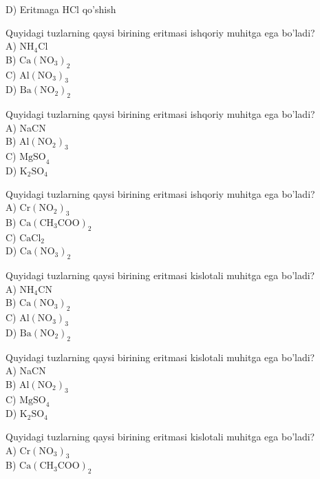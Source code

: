 D) Eritmaga HCl qo'shish
  \item Quyidagi tuzlarning qaysi birining eritmasi ishqoriy muhitga ega bo'ladi?\\
A) $\mathrm{NH}_{4} \mathrm{Cl}$\\
B) $\mathrm{Ca}\left(\mathrm{NO}_{3}\right)_{2}$\\
C) $\mathrm{Al}\left(\mathrm{NO}_{3}\right)_{3}$\\
D) $\mathrm{Ba}\left(\mathrm{NO}_{2}\right)_{2}$\\
  \item Quyidagi tuzlarning qaysi birining eritmasi ishqoriy muhitga ega bo'ladi?\\
A) NaCN\\
B) $\mathrm{Al}\left(\mathrm{NO}_{2}\right)_{3}$\\
C) $\mathrm{MgSO}_{4}$\\
D) $\mathrm{K}_{2} \mathrm{SO}_{4}$
  \item Quyidagi tuzlarning qaysi birining eritmasi ishqoriy muhitga ega bo'ladi?\\
A) $\mathrm{Cr}\left(\mathrm{NO}_{2}\right)_{3}$\\
B) $\mathrm{Ca}\left(\mathrm{CH}_{3} \mathrm{COO}\right)_{2}$\\
C) $\mathrm{CaCl}_{2}$\\
D) $\mathrm{Ca}\left(\mathrm{NO}_{3}\right)_{2}$
  \item Quyidagi tuzlarning qaysi birining eritmasi kislotali muhitga ega bo'ladi?\\
A) $\mathrm{NH}_{4} \mathrm{CN}$\\
B) $\mathrm{Ca}\left(\mathrm{NO}_{3}\right)_{2}$\\
C) $\mathrm{Al}\left(\mathrm{NO}_{3}\right)_{3}$\\
D) $\mathrm{Ba}\left(\mathrm{NO}_{2}\right)_{2}$
  \item Quyidagi tuzlarning qaysi birining eritmasi kislotali muhitga ega bo'ladi?\\
A) NaCN\\
B) $\mathrm{Al}\left(\mathrm{NO}_{2}\right)_{3}$\\
C) $\mathrm{MgSO}_{4}$\\
D) $\mathrm{K}_{2} \mathrm{SO}_{4}$
  \item Quyidagi tuzlarning qaysi birining eritmasi kislotali muhitga ega bo'ladi?\\
A) $\mathrm{Cr}\left(\mathrm{NO}_{3}\right)_{3}$\\
B) $\mathrm{Ca}\left(\mathrm{CH}_{3} \mathrm{COO}\right)_{2}$\\
